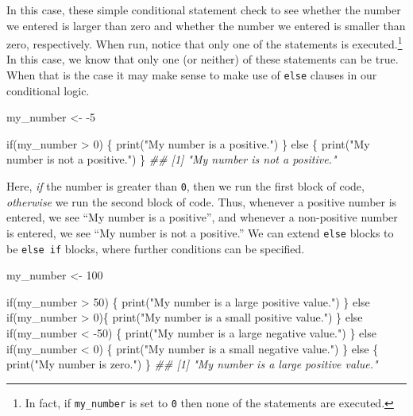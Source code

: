 \documentclass[
  letterpaper,
  DIV=11,
  numbers=noendperiod]{scrreprt}
\newenvironment{Shaded}{\begin{snugshade}}{\end{snugshade}}
\newcommand{\ControlFlowTok}[1]{\textcolor[rgb]{0.00,0.23,0.31}{#1}}
\newcommand{\DecValTok}[1]{\textcolor[rgb]{0.68,0.00,0.00}{#1}}
\newcommand{\DocumentationTok}[1]{\textcolor[rgb]{0.37,0.37,0.37}{\textit{#1}}}
\newcommand{\FunctionTok}[1]{\textcolor[rgb]{0.28,0.35,0.67}{#1}}
\newcommand{\NormalTok}[1]{\textcolor[rgb]{0.00,0.23,0.31}{#1}}
\newcommand{\OtherTok}[1]{\textcolor[rgb]{0.00,0.23,0.31}{#1}}
\newcommand{\SpecialCharTok}[1]{\textcolor[rgb]{0.37,0.37,0.37}{#1}}
\newcommand{\StringTok}[1]{\textcolor[rgb]{0.13,0.47,0.30}{#1}}
\theoremstyle{definition}
\theoremstyle{definition}
\theoremstyle{definition}
\theoremstyle{remark}
\begin{document}
In this case, these simple conditional statement check to see whether
the number we entered is larger than zero and whether the number we
entered is smaller than zero, respectively. When run, notice that only
one of the statements is executed.\footnote{In fact, if
  \texttt{my\_number} is set to \texttt{0} then none of the statements
  are executed.} In this case, we know that only one (or neither) of
these statements can be true. When that is the case it may make sense to
make use of \texttt{else} clauses in our conditional logic.

\begin{Shaded}
\begin{Highlighting}[]
\NormalTok{my\_number }\OtherTok{\textless{}{-}} \SpecialCharTok{{-}}\DecValTok{5}

\ControlFlowTok{if}\NormalTok{(my\_number }\SpecialCharTok{\textgreater{}} \DecValTok{0}\NormalTok{) \{}
    \FunctionTok{print}\NormalTok{(}\StringTok{"My number is a positive."}\NormalTok{)}
\NormalTok{\} }\ControlFlowTok{else}\NormalTok{ \{}
    \FunctionTok{print}\NormalTok{(}\StringTok{"My number is not a positive."}\NormalTok{)}
\NormalTok{\}}
\DocumentationTok{\#\# [1] "My number is not a positive."}
\end{Highlighting}
\end{Shaded}

Here, \emph{if} the number is greater than \texttt{0}, then we run the
first block of code, \emph{otherwise} we run the second block of code.
Thus, whenever a positive number is entered, we see ``My number is a
positive'', and whenever a non-positive number is entered, we see ``My
number is not a positive.'' We can extend \texttt{else} blocks to be
\texttt{else\ if} blocks, where further conditions can be specified.

\begin{Shaded}
\begin{Highlighting}[]
\NormalTok{my\_number }\OtherTok{\textless{}{-}} \DecValTok{100}

\ControlFlowTok{if}\NormalTok{(my\_number }\SpecialCharTok{\textgreater{}} \DecValTok{50}\NormalTok{) \{}
    \FunctionTok{print}\NormalTok{(}\StringTok{"My number is a large positive value."}\NormalTok{)}
\NormalTok{\} }\ControlFlowTok{else} \ControlFlowTok{if}\NormalTok{(my\_number }\SpecialCharTok{\textgreater{}} \DecValTok{0}\NormalTok{)\{}
    \FunctionTok{print}\NormalTok{(}\StringTok{"My number is a small positive value."}\NormalTok{)}
\NormalTok{\} }\ControlFlowTok{else} \ControlFlowTok{if}\NormalTok{(my\_number }\SpecialCharTok{\textless{}} \SpecialCharTok{{-}}\DecValTok{50}\NormalTok{) \{}
    \FunctionTok{print}\NormalTok{(}\StringTok{"My number is a large negative value."}\NormalTok{)}
\NormalTok{\} }\ControlFlowTok{else} \ControlFlowTok{if}\NormalTok{(my\_number }\SpecialCharTok{\textless{}} \DecValTok{0}\NormalTok{) \{}
    \FunctionTok{print}\NormalTok{(}\StringTok{"My number is a small negative value."}\NormalTok{)}
\NormalTok{\} }\ControlFlowTok{else}\NormalTok{ \{}
    \FunctionTok{print}\NormalTok{(}\StringTok{"My number is zero."}\NormalTok{)}
\NormalTok{\}}
\DocumentationTok{\#\# [1] "My number is a large positive value."}
\end{Highlighting}
\end{Shaded}
\end{document}
